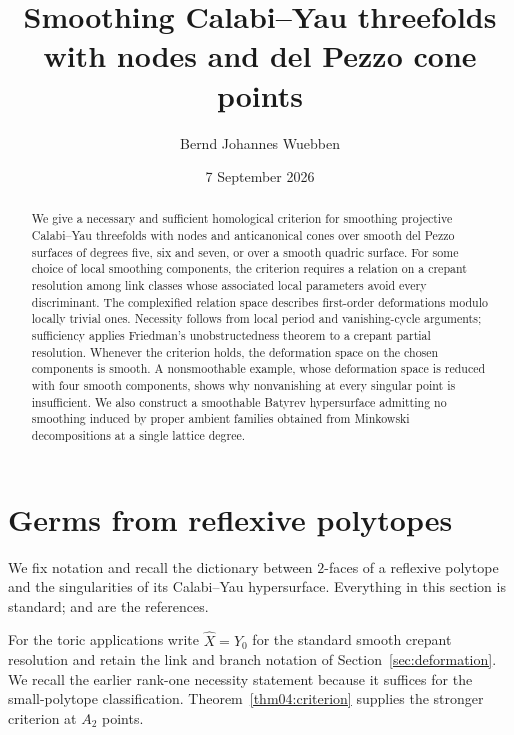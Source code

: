 \documentclass[11pt]{amsart}
\title[Nodes and del Pezzo cone points]{Smoothing Calabi--Yau threefolds\\ with
nodes and del Pezzo cone points}
\author{Bernd Johannes Wuebben}
\date{7 September 2026}
\theoremstyle{definition}
\theoremstyle{remark}
\theoremstyle{plain}
\newcommand{\Xh}{\widehat{X}}
\begin{document}
\begin{abstract}
We give a necessary and sufficient homological criterion for smoothing
projective Calabi--Yau threefolds with nodes and anticanonical cones over
smooth del Pezzo surfaces of degrees five, six and seven, or over a smooth
quadric surface. For some choice of local smoothing components, the
criterion requires a relation on a crepant resolution among link classes
whose associated local parameters avoid every discriminant. The
complexified relation space describes first-order deformations modulo
locally trivial ones. Necessity follows from local period and vanishing-cycle
arguments; sufficiency applies Friedman's unobstructedness theorem to a
crepant partial resolution. Whenever the criterion holds, the
deformation space on the chosen components is smooth. A nonsmoothable
example, whose deformation space is reduced with four smooth components,
shows why nonvanishing at every singular point is insufficient. We also
construct a smoothable Batyrev hypersurface admitting no smoothing induced
by proper ambient families obtained from Minkowski decompositions at a
single lattice degree.
\end{abstract}

\maketitle







\section{Germs from reflexive polytopes}\label{sec:germs}

We fix notation and recall the dictionary between $2$-faces of a reflexive
polytope and the singularities of its Calabi--Yau hypersurface.  Everything in
this section is standard; \cite{Batyrev94} and \cite{CoxLittleSchenck} are the
references.

For the toric applications write $\Xh=Y_0$ for the standard smooth
crepant resolution and retain the link and branch notation of
Section~\ref{sec:deformation}.  We recall the earlier rank-one necessity
statement because it suffices for the small-polytope classification.
Theorem~\ref{thm04:criterion} supplies the stronger criterion at $A_2$
points.
\end{document}
